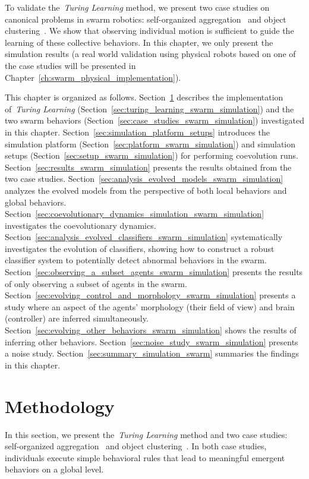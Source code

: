 To validate the~\textit{Turing Learning} method, we present two case studies on canonical problems in swarm robotics: self-organized aggregation~\cite{Gauci2014_ijrr} and object clustering~\cite{Melvin2014_aamas}. We show that observing individual motion is sufficient to guide the learning of these collective behaviors. In this chapter, we only present the simulation results (a real world validation using physical robots based on one of the case studies will be presented in Chapter~\ref{ch:swarm_physical_implementation}). 

This chapter is organized as follows. Section~\ref{sec:methodology_swarm_simulation} describes the implementation of~\textit{Turing Learning} (Section~\ref{sec:turing_learning_swarm_simulation}) and the two swarm behaviors (Section~\ref{sec:case_studies_swarm_simulation}) investigated in this chapter. Section~\ref{sec:simulation_platform_setups} introduces the simulation platform (Section~\ref{sec:platform_swarm_simulation}) and simulation setups (Section~\ref{sec:setup_swarm_simulation}) for performing coevolution runs. Section~\ref{sec:results_swarm_simulation} presents the results obtained from the two case studies. Section~\ref{sec:analysis_evolved_models_swarm_simulation} analyzes the evolved models from the perspective of both local behaviors and global behaviors. Section~\ref{sec:coevolutionary_dynamics_simulation_swarm_simulation} investigates the coevolutionary dynamics. Section~\ref{sec:analysis_evolved_classifiers_swarm_simulation} systematically investigates the evolution of classifiers, showing how to construct a robust classifier system to potentially detect abnormal behaviors in the swarm. Section~\ref{sec:observing_a_subset_agents_swarm_simulation} presents the results of only observing a subset of agents in the swarm. Section~\ref{sec:evolving_control_and_morphology_swarm_simulation} presents a study where an aspect of the agents' morphology (their field of view) and brain (controller) are inferred simultaneously. Section~\ref{sec:evolving_other_behaviors_swarm_simulation} shows the results of inferring other behaviors. Section~\ref{sec:noise_study_swarm_simulation} presents a noise study. Section~\ref{sec:summary_simulation_swarm} summaries the findings in this chapter.

\section{Methodology}\label{sec:methodology_swarm_simulation}

In this section, we present the~\textit{Turing Learning} method and two case studies: self-organized aggregation~\cite{Gauci2014_ijrr} and object clustering~\cite{Melvin2014_aamas}. In both case studies, individuals execute simple behavioral rules that lead to meaningful emergent behaviors on a global level. 


